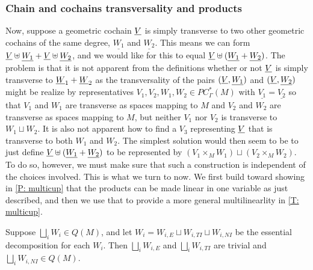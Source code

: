 \subsubsection{Chain and cochains transversality and products}\label{S: trans products}

Now, suppose a geometric cochain $\underline{V}$ is simply transverse to two other geometric cochains of the same degree, $\underline{W_1}$ and $\underline{W_2}$.
This means we can form $\underline{V}\uplus \underline{W_1}+\underline{V}\uplus \underline{W_2}$, and we would like for this to equal $\underline{V}\uplus (\underline{W_1} + \underline{W_2})$.
The problem is that it is not apparent from the definitions whether or not $\underline{V}$ is simply transverse to $\underline{W}_1+\underline{W}_2$ as the transversality of the pairs $(\underline{V},\underline{W_1})$ and $(\underline{V},\underline{W_2})$ might be realize by representatives $V_1,V_2, W_1,W_2 \in PC^*_\Gamma(M)$ with $\underline{V_1} = \underline{V_2}$ so that $V_1$ and $W_1$ are transverse as spaces mapping to $M$ and $V_2$ and $W_2$ are transverse as spaces mapping to $M$, but neither $V_1$ nor $V_2$ is transverse to $W_1 \sqcup W_2$.
It is also not apparent how to find a $V_3$ representing $\underline{V}$ that is transverse to both $W_1$ and $W_2$.
The simplest solution would then seem to be to just define
$\underline{V}\uplus (\underline{W_1}+\underline{W_2})$ to be represented by $(V_1 \times_M W_1) \sqcup (V_2 \times_M W_2)$.
To do so, however, we must make sure that such a construction is independent of the choices involved.
This is what we turn to now.
We first build toward showing in \cref{P: multicup} that the products can be made linear in one variable as just described, and then we use that to provide a more general multilinearlity in \cref{T: multicup}.

\begin{lemma}\label{L: Q essential}
	Suppose $\bigsqcup_i W_i \in Q(M)$, and let $W_i = W_{i,E} \sqcup W_{i,TI} \sqcup W_{i,NI}$ be the essential decomposition for each $W_i$.
	Then $\bigsqcup_i W_{i,E}$ and $\bigsqcup_i W_{i,TI}$ are trivial and $\bigsqcup_i W_{i,NI} \in Q(M)$.
\end{lemma}

